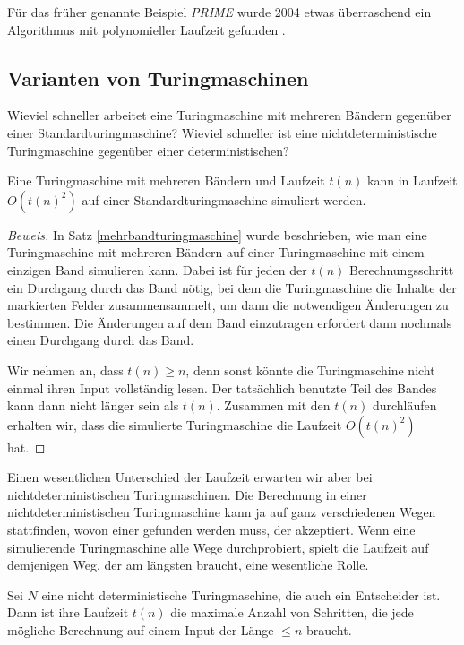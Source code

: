 \begin{beispiel}
Für das früher genannte Beispiel \textsl{PRIME} wurde 2004 etwas
überraschend ein Algorithmus mit
polynomieller Laufzeit gefunden \cite{skript:aks}.
\end{beispiel}

\subsection{Varianten von Turingmaschinen}
Wieviel schneller arbeitet eine Turingmaschine mit mehreren Bändern 
gegenüber einer Standardturingmaschine? Wieviel schneller ist eine
nichtdeterministische Turingmaschine gegenüber einer deterministischen?

\begin{satz}
%
Eine Turingmaschine mit mehreren Bändern und Laufzeit $t(n)$ kann
in Laufzeit $O(t(n)^2)$ auf einer Standardturingmaschine
simuliert werden.
\end{satz}

\begin{proof}[Beweis]
In Satz \ref{mehrbandturingmaschine} wurde beschrieben, wie man eine
Turingmaschine mit mehreren Bändern auf einer Turingmaschine mit
einem einzigen Band simulieren kann. Dabei ist für jeden der
$t(n)$ Berechnungsschritt ein Durchgang durch das Band nötig, bei
dem die Turingmaschine die Inhalte der markierten Felder zusammensammelt,
um dann die notwendigen Änderungen zu bestimmen. Die Änderungen
auf dem Band einzutragen erfordert dann nochmals einen Durchgang
durch das Band.

Wir nehmen an, dass $t(n)\ge n$, denn sonst könnte die
Turingmaschine nicht einmal ihren Input vollständig lesen.
Der tatsächlich benutzte Teil des Bandes kann dann nicht länger sein
als $t(n)$. Zusammen mit den $t(n)$ durchläufen erhalten wir,
dass die simulierte Turingmaschine die Laufzeit $O(t(n)^2)$ hat.
\end{proof}

Einen wesentlichen Unterschied der Laufzeit erwarten wir aber
bei nichtdeterministischen Turingmaschinen.
Die Berechnung in einer nichtdeterministischen Turingmaschine
kann ja auf ganz verschiedenen Wegen stattfinden, wovon
einer gefunden werden muss, der akzeptiert. Wenn eine simulierende
Turingmaschine alle Wege durchprobiert, spielt die Laufzeit auf
demjenigen Weg, der am längsten braucht, eine wesentliche Rolle.

\begin{definition}
%
Sei $N$ eine nicht deterministische Turingmaschine, die auch ein
Entscheider ist. Dann ist ihre Laufzeit $t(n)$ die maximale Anzahl
von Schritten, die jede mögliche Berechnung auf einem Input der
Länge $\le n$ braucht.
\end{definition}

